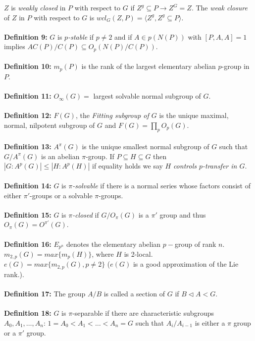 $Z$ is \emph {weakly closed} in $P$ with respect to $G$ if $Z^g \subseteq P \rightarrow Z^G=Z$.
The \emph {weak closure} of $Z$ in $P$ with respect to $G$ is $wcl_G(Z, P)= 
\langle Z^g, Z^g \subseteq P \rangle $.
\\
\\
{\bf Definition 9:}
$G$ is $p$\emph{-stable} if $p \ne 2$ and 
if $A \in p(N(P))$ with $[P,A,A]= 1$ implies $A C(P)/C(P) \subseteq O_p (N(P)/C(P))$.
\\
\\
{\bf Definition 10:}
$m_p(P)$ is the rank of the largest elementary abelian $p$-group in $P$.
\\
\\
{\bf Definition 11:}
$O_{\infty}(G)=$ largest solvable normal subgroup of $G$.
\\
\\
{\bf Definition 12:} $F(G)$, the \emph{Fitting subgroup of $G$}
is the unique maximal, normal, nilpotent subgroup of $G$ and
$F(G)= \prod_p O_p(G)$.
\\
\\
{\bf Definition 13:} $A^{\pi}(G)$ is the unique smallest normal subgroup of $G$ such that
$G/A^{\pi}(G)$ is an abelian $\pi$-group.  If $P \subseteq H \subseteq G$ then
$ |G:A^p(G)| \le |H:A^p(H)|$ if equality holds we say $H$ \emph {controls $p$-transfer in $G$}.
\\
\\
{\bf Definition 14:}
$G$  is
$\pi$\emph{-solvable} if there is a normal series whose factors
consist of either $\pi'$-groups or a solvable
$\pi$-groups.
\\
\\
{\bf Definition 15:} $G$ is $\pi$\emph{-closed} if $G/O_{\pi}(G)$ is a $\pi'$ group and thus
$O_{\pi}(G)=O^{\pi'}(G)$.
\\
\\
{\bf Definition 16:}
$E_{p^n}$ denotes the elementary abelian $p-$group of rank $n$.
$m_{2,p}(G) = max \{ m_p (H) \}$, where $H$ is 2-local.
$e(G) = max \{ m_{2,p} (G), p \ne 2 \}$ ($e(G)$ is a good approximation of
the Lie rank.).
\\
\\
{\bf Definition 17:} The group $A/B$ is called a section of $G$ if $B \lhd A <G$.
\\
\\
{\bf Definition 18:} $G$ is $\pi$-separable if there are characteristic subgroups
$A_0, A_1, \ldots , A_n$: $1=A_0<A_1<\ldots<A_n=G$ such that $A_i/A_{i-1}$ is
either a $\pi$ group or a $\pi'$ group.
\\

